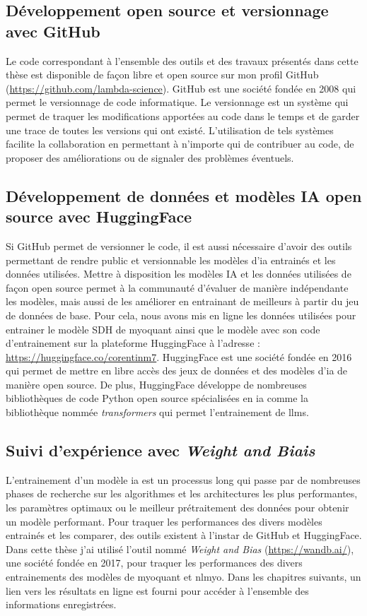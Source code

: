\subsection{Développement open source et versionnage avec GitHub}
Le code correspondant à l'ensemble des outils et des travaux présentés dans cette thèse est disponible de façon libre et open source sur mon profil GitHub (\href{https://github.com/lambda-science}{https://github.com/lambda-science}). GitHub est une société fondée en 2008 qui permet le versionnage de code informatique. Le versionnage est un système qui permet de traquer les modifications apportées  au code dans le temps et de garder une trace de toutes les versions qui ont existé. L'utilisation de tels systèmes facilite la collaboration en permettant à n'importe qui de contribuer au code, de proposer des améliorations ou de signaler des problèmes éventuels.

\subsection{Développement de données et modèles IA open source avec HuggingFace}
Si GitHub permet de versionner le code, il est aussi nécessaire d'avoir des outils permettant de rendre public et versionnable les modèles d'\gls{ia} entrainés et les données utilisées. Mettre à disposition les modèles IA et les données utilisées de façon open source permet à la communauté d'évaluer de manière indépendante les modèles, mais aussi de les améliorer en entrainant de meilleurs à partir du jeu de données de base. Pour cela, nous avons mis en ligne les données utilisées pour entrainer le modèle SDH de \gls{myoquant} ainsi que le modèle avec son code d'entrainement sur la plateforme HuggingFace à l'adresse : \href{https://huggingface.co/corentinm7}{https://huggingface.co/corentinm7}. HuggingFace est une société fondée en 2016 qui permet de mettre en libre accès des jeux de données et des modèles d'\gls{ia} de manière open source. De plus, HuggingFace développe de nombreuses bibliothèques de code Python open source spécialisées en \gls{ia} comme la bibliothèque nommée \textit{transformers} qui permet l'entrainement de \gls{llms}.

\subsection{Suivi d'expérience avec \textit{Weight and Biais}}
L'entrainement d'un modèle \gls{ia} est un processus long qui passe par de nombreuses phases de recherche sur les algorithmes et les architectures les plus performantes, les paramètres optimaux ou le meilleur prétraitement des données pour obtenir  un modèle performant. Pour traquer les performances des divers modèles entrainés et les comparer, des outils existent à l'instar de GitHub et HuggingFace. Dans cette thèse j'ai utilisé l'outil nommé \textit{Weight and Bias} (\href{https://wandb.ai/}{https://wandb.ai/}), une société fondée en 2017, pour traquer les performances des divers entrainements des modèles de \gls{myoquant} et \gls{nlmyo}. Dans les chapitres suivants, un lien vers les résultats en ligne est fourni pour accéder à l'ensemble des informations enregistrées.

